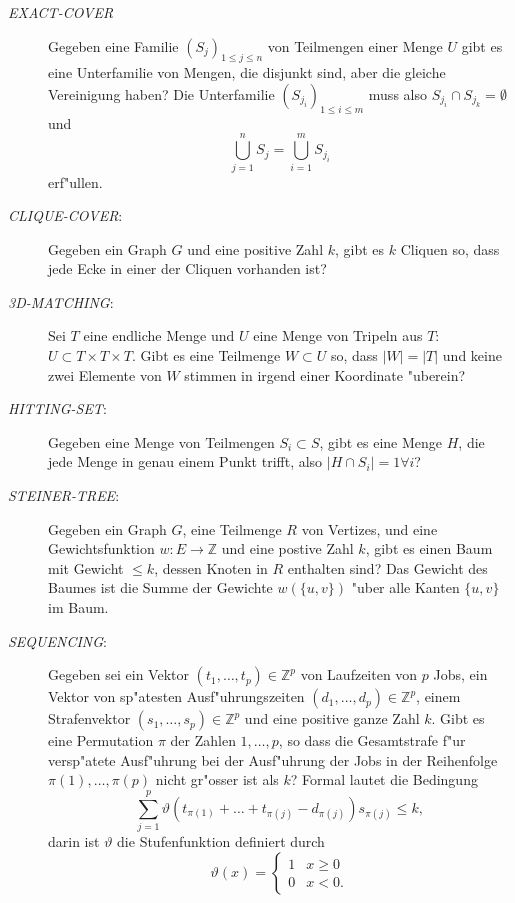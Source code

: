 \begin{description}
\item[\textsl{EXACT-COVER}] Gegeben eine Familie $(S_j)_{1\le j\le n}$
von Teilmengen
einer Menge $U$ gibt es eine Unterfamilie von Mengen, die disjunkt sind,
aber die gleiche Vereinigung haben?
Die Unterfamilie $(S_{j_i})_{1\le i\le m}$ muss also
$S_{j_i}\cap S_{j_k}=\emptyset$ und 
\[
\bigcup_{j=1}^n S_j=\bigcup_{i=1}^mS_{j_i}
\]
erf"ullen.
\item[\textsl{CLIQUE-COVER}:] Gegeben ein Graph $G$ und eine positive Zahl
$k$, gibt es $k$ Cliquen so, dass jede Ecke in einer der Cliquen
vorhanden ist?
\item[\textsl{3D-MATCHING}:] Sei $T$ eine endliche Menge und $U$ eine 
Menge von Tripeln aus $T$: $U\subset T\times T\times T$. Gibt es eine
Teilmenge $W\subset U$ so, dass $|W|=|T|$ und keine zwei Elemente
von $W$ stimmen in irgend einer Koordinate "uberein?
\item[\textsl{HITTING-SET}:] Gegeben eine Menge von Teilmengen $S_i\subset S$,
gibt es eine Menge $H$, die jede Menge in genau einem Punkt trifft, also
$|H\cap S_i|=1\forall i$?
\item[\textsl{STEINER-TREE}:]
Gegeben ein Graph $G$, eine Teilmenge $R$ von Vertizes, und eine
Gewichtsfunktion $w\colon E\to\mathbb Z$ und eine postive Zahl $k$, gibt es
einen Baum mit Gewicht $\le k$, dessen Knoten in $R$ enthalten sind?
Das Gewicht des Baumes ist die Summe der Gewichte 
$w(\{u,v\})$ "uber alle Kanten $\{u,v\}$ im Baum.
\item[\textsl{SEQUENCING}:] Gegeben sei ein Vektor
$(t_1,\dots,t_p)\in\mathbb Z^p$
von Laufzeiten von $p$ Jobs, ein Vektor von sp"atesten Ausf"uhrungszeiten 
$(d_1,\dots,d_p)\in\mathbb Z^p$, einem Strafenvektor 
$(s_1,\dots,s_p)\in\mathbb Z^p$ und eine positive ganze Zahl $k$.
Gibt es eine Permutation $\pi$ der Zahlen $1,\dots,p$, so dass
die Gesamtstrafe f"ur versp"atete Ausf"uhrung bei der Ausf"uhrung der Jobs
in der Reihenfolge $\pi(1),\dots,\pi(p)$ nicht gr"osser ist als $k$? 
Formal lautet die Bedingung
\[
\sum_{j=1}^p
\vartheta(t_{\pi(1)} +\dots +t_{\pi(j)} - d_{\pi(j)}) s_{\pi(j)} \le k,
\]
darin ist $\vartheta$ die Stufenfunktion definiert durch
\[
\vartheta(x)=\begin{cases}
1&x\ge 0\\
0&x<0.
\end{cases}
\]
\end{description}
